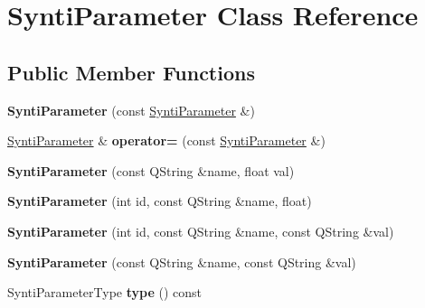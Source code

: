 \hypertarget{class_synti_parameter}{}\section{Synti\+Parameter Class Reference}
\label{class_synti_parameter}
\subsection*{Public Member Functions}
\begin{DoxyCompactItemize}
\item 
\mbox{\label{class_synti_parameter_afeb41260711b6a51b5c71a7716dddc54}} 
{\bfseries Synti\+Parameter} (const \hyperlink{class_synti_parameter}{Synti\+Parameter} \&)
\item 
\mbox{\label{class_synti_parameter_a1fec53b78323e2ffd2234a00128121be}} 
\hyperlink{class_synti_parameter}{Synti\+Parameter} \& {\bfseries operator=} (const \hyperlink{class_synti_parameter}{Synti\+Parameter} \&)
\item 
\mbox{\label{class_synti_parameter_a5bd125c3eb229165c98eb1db96b23a5b}} 
{\bfseries Synti\+Parameter} (const Q\+String \&name, float val)
\item 
\mbox{\label{class_synti_parameter_abdfc1e41cc4e3dfa0cc050ac8921ae54}} 
{\bfseries Synti\+Parameter} (int id, const Q\+String \&name, float)
\item 
\mbox{\label{class_synti_parameter_a1d91e7e99cb77a2b89cc585915feb0d7}} 
{\bfseries Synti\+Parameter} (int id, const Q\+String \&name, const Q\+String \&val)
\item 
\mbox{\label{class_synti_parameter_a9722289ac905d8d3a44c13161d0fc395}} 
{\bfseries Synti\+Parameter} (const Q\+String \&name, const Q\+String \&val)
\item 
\mbox{\label{class_synti_parameter_a24fdb8d51f7090fddf7c94ef8db057f8}} 
Synti\+Parameter\+Type {\bfseries type} () const
\item 
\mbox{\label{class_synti_parameter_a855ac0cced0976a2ae4623faefc5bbfb}} 

\end{DoxyCompactItemize}
